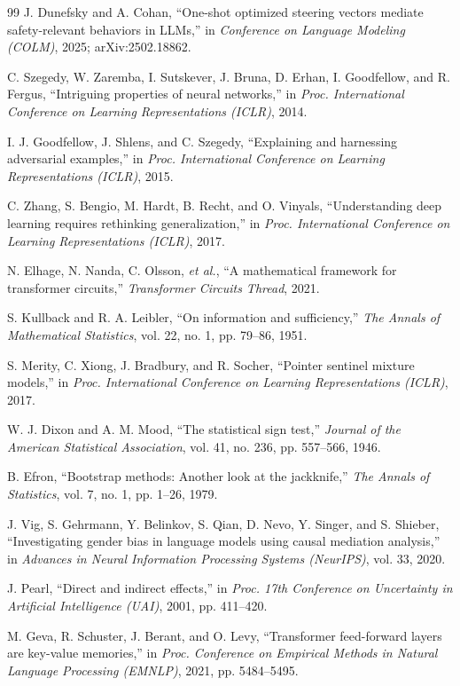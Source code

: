 \begin{thebibliography}{99}
 J. Dunefsky and A. Cohan, ``One-shot optimized steering vectors mediate safety-relevant behaviors in LLMs,'' in \textit{Conference on Language Modeling (COLM)}, 2025; arXiv:2502.18862.

 C. Szegedy, W. Zaremba, I. Sutskever, J. Bruna, D. Erhan, I. Goodfellow, and R. Fergus, ``Intriguing properties of neural networks,'' in \textit{Proc. International Conference on Learning Representations (ICLR)}, 2014.

 I. J. Goodfellow, J. Shlens, and C. Szegedy, ``Explaining and harnessing adversarial examples,'' in \textit{Proc. International Conference on Learning Representations (ICLR)}, 2015.

 C. Zhang, S. Bengio, M. Hardt, B. Recht, and O. Vinyals, ``Understanding deep learning requires rethinking generalization,'' in \textit{Proc. International Conference on Learning Representations (ICLR)}, 2017.

 N. Elhage, N. Nanda, C. Olsson, \textit{et al.}, ``A mathematical framework for transformer circuits,'' \textit{Transformer Circuits Thread}, 2021.

 S. Kullback and R. A. Leibler, ``On information and sufficiency,'' \textit{The Annals of Mathematical Statistics}, vol. 22, no. 1, pp. 79--86, 1951.

 S. Merity, C. Xiong, J. Bradbury, and R. Socher, ``Pointer sentinel mixture models,'' in \textit{Proc. International Conference on Learning Representations (ICLR)}, 2017.

 W. J. Dixon and A. M. Mood, ``The statistical sign test,'' \textit{Journal of the American Statistical Association}, vol. 41, no. 236, pp. 557--566, 1946.

 B. Efron, ``Bootstrap methods: Another look at the jackknife,'' \textit{The Annals of Statistics}, vol. 7, no. 1, pp. 1--26, 1979.

 J. Vig, S. Gehrmann, Y. Belinkov, S. Qian, D. Nevo, Y. Singer, and S. Shieber, ``Investigating gender bias in language models using causal mediation analysis,'' in \textit{Advances in Neural Information Processing Systems (NeurIPS)}, vol. 33, 2020.

 J. Pearl, ``Direct and indirect effects,'' in \textit{Proc. 17th Conference on Uncertainty in Artificial Intelligence (UAI)}, 2001, pp. 411--420.

 M. Geva, R. Schuster, J. Berant, and O. Levy, ``Transformer feed-forward layers are key-value memories,'' in \textit{Proc. Conference on Empirical Methods in Natural Language Processing (EMNLP)}, 2021, pp. 5484--5495.


\end{thebibliography}

